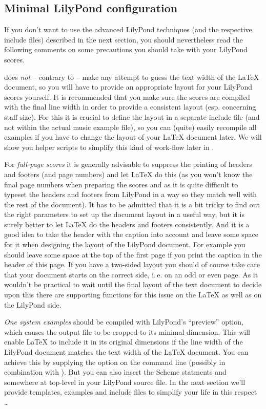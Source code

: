 \documentclass[../openLilyLib]{subfiles}
\begin{document}
\subsection{Minimal LilyPond configuration}
\label{subsec:xmp_minimal-lilypond-configuration}
If you don't want to use the advanced LilyPond techniques (and the respective include files) described in the next section, you should nevertheless read the following comments on some precautions you should take with your LilyPond scores.

 does \emph{not} -- contrary to  -- make any attempt to guess the text width of the \LaTeX{} document, so you will have to provide an appropriate layout for your LilyPond scores yourself.
It is recommended that you make sure the scores are compiled with the final line width in order to provide a consistent layout (esp. concerning staff size).
For this it is crucial to define the layout in a separate include file (and not within the actual music example file), so you can (quite) easily recompile all examples if you have to change the layout of your \LaTeX{} document later.
We will show you helper scripts to simplify this kind of work-flow later in .

For \emph{full-page scores} it is generally advisable to suppress the printing of headers and footers (and page numbers) and let \LaTeX{} do this (as you won't know the final page numbers when preparing the scores and as it is quite difficult to typeset the headers and footers from LilyPond in a way so they match well with the rest of the document).
It has to be admitted that it is a bit tricky to find out the right parameters to set up the document layout in a useful way, but it is surely better to let \LaTeX{} do the headers and footers consistently.
And it is a good idea to take the header with the caption into account and leave some space for it when designing the layout of the LilyPond document.
For example you should leave some space at the top of the first page if you print the caption in the header of this page.
If you have a two-sided layout you should of course take care that your document starts on the correct side, i.\,e. on an odd or even page.
As it wouldn't be practical to wait until the final layout of the text document to decide upon this there are supporting functions for this issue on the \LaTeX{} as well as on the LilyPond side.

\emph{One system examples} should be compiled with LilyPond's “preview” option, which causes the output file to be cropped to its minimal dimension.
This will enable \LaTeX{} to include it in its original dimensions if the line width of the LilyPond document matches the text width of the \LaTeX{} document.
You can achieve this by supplying the  option on the command line (possibly in combination with ).
But you can also insert the Scheme statments  and  somewhere at top-level in your LilyPond source file.
In the next section we'll provide templates, examples and include files to simplify your life in this respect \dots
\end{document}
